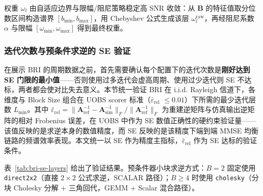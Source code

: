 \documentclass{CjC}
\begin{document}
    权重 $\omega_{l}$ 由自适应边界与限幅/阻尼策略稳定高 SNR 收敛：从 $\bm{B}$ 的特征值取分位数区间构造谱界
    $[b_{\min},b_{\max}]$，用 Chebyshev 公式生成该层 $\omega_{l}^{\text{raw}}$，再经阻尼系数
    $\alpha$ 与限幅 $[\omega_{\min},\omega_{\max}]$ 得到最终权重。

    \subsubsection{迭代次数与预条件求逆的 SE 验证}
    \label{sec:bri-se-verify}

    在展示 BRI 的周期数据之前，首先需要确认每个配置下的迭代次数是\textbf{刚好达到
    SE 门限的最小值}——否则使用过多迭代会虚高周期、使用过少迭代则 SE
    不达标，两者都会使对比失去意义。本节统一验证 BRI 在 i.i.d. Rayleigh 信道下，各维度与
    Block Size 组合在 UOBS scorer 标准（$\bar{\varepsilon}_{\text{rel}}$ $\leq 0.01$）下所需的最少迭代层数
    $L_{\min}$。其中 $\bar{\varepsilon}_{\text{rel}} = \|\bm{A}^{-1}_{\text{ref}} - \bm{A}^{-1}_{\text{sim}}\|_F / \|\bm{A}^{-1}_{\text{ref}}\|_F$ 为重建逆矩阵与仿真输出逆矩阵的相对 Frobenius 误差，在 UOBS 中作为 SE 数值正确性的硬约束验证量——该值反映的是求逆本身的数值精度，而 SE 反映的是该精度下端到端 MMSE 均衡链路的频谱效率表现。本文统一以 SE 作为精度主指标，$\bar{\varepsilon}_{\text{rel}}$ 作为 SE 达标的验证条件。

    表~\ref{tab:bri-se-layers} 给出了验证结果。预条件器小块求逆方式：$B=2$ 固定使用
    \texttt{direct2x2}（直接 $2\times2$ 公式求逆，SCALAR 路径）；$B\ge4$ 时使用
    \texttt{cholesky}（分块 Cholesky 分解 + 三角回代，GEMM + Scalar 混合路径）。
\end{document}
